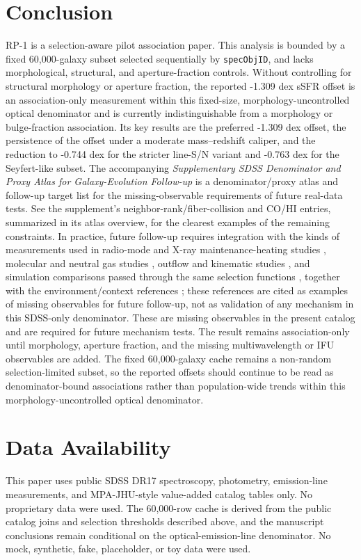 \documentclass[twocolumn]{aastex631}
\begin{document}
\section{Conclusion}
RP-1 is a selection-aware pilot association paper. This analysis is bounded by a fixed 60,000-galaxy subset selected sequentially by \texttt{specObjID}, and lacks morphological, structural, and aperture-fraction controls. Without controlling for structural morphology or aperture fraction, the reported -1.309 dex sSFR offset is an association-only measurement within this fixed-size, morphology-uncontrolled optical denominator and is currently indistinguishable from a morphology or bulge-fraction association. Its key results are the preferred -1.309 dex offset, the persistence of the offset under a moderate mass--redshift caliper, and the reduction to -0.744 dex for the stricter line-S/N variant and -0.763 dex for the Seyfert-like subset. The accompanying \emph{Supplementary SDSS Denominator and Proxy Atlas for Galaxy-Evolution Follow-up} is a denominator/proxy atlas and follow-up target list for the missing-observable requirements of future real-data tests. See the supplement's neighbor-rank/fiber-collision and CO/HI entries, summarized in its atlas overview, for the clearest examples of the remaining constraints.
In practice, future follow-up requires integration with the kinds of measurements used in radio-mode and X-ray maintenance-heating studies \citep{best2005,fabian2012,mcnamara2007,heckmanbest2014,lamassa2013}, molecular and neutral gas studies \citep{xcoldgass2017,xgass2018}, outflow and kinematic studies \citep{veilleux2005,cicone2014,carniani2017,fiore2017}, and simulation comparisons passed through the same selection functions \citep{simba2019,tng2019,eagle2015}, together with the environment/context references \citep{peng2010,ellison2011,piotrowska2022,wetzel2013,dekel2006}; these references are cited as examples of missing observables for future follow-up, not as validation of any mechanism in this SDSS-only denominator. These are missing observables in the present catalog and are required for future mechanism tests. The result remains association-only until morphology, aperture fraction, and the missing multiwavelength or IFU observables are added. The fixed 60,000-galaxy cache remains a non-random selection-limited subset, so the reported offsets should continue to be read as denominator-bound associations rather than population-wide trends within this morphology-uncontrolled optical denominator.

\section*{Data Availability}
This paper uses public SDSS DR17 spectroscopy, photometry, emission-line measurements, and MPA-JHU-style value-added catalog tables only. No proprietary data were used. The 60,000-row cache is derived from the public catalog joins and selection thresholds described above, and the manuscript conclusions remain conditional on the optical-emission-line denominator. No mock, synthetic, fake, placeholder, or toy data were used.
\end{document}
